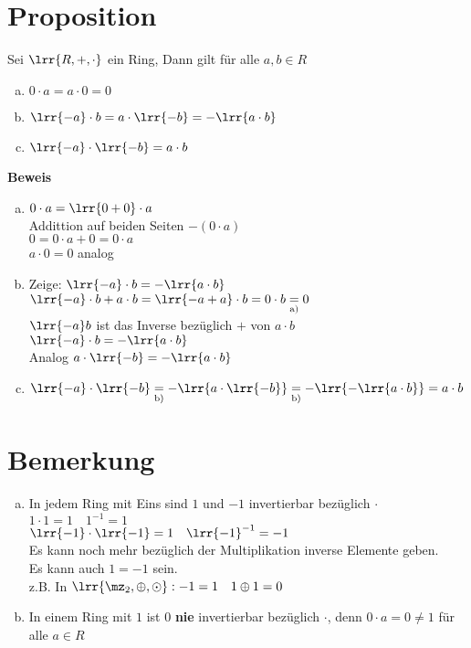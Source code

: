 \section{Proposition}
	Sei $\lrr{R,+,\cdot}$ ein Ring, Dann gilt für alle $a,b\in R$
	\begin{enumerate}[a)]
		\item $0\cdot a=a\cdot 0=0$
		\item $\lrr{-a}\cdot b=a\cdot\lrr{-b}=-\lrr{a\cdot b}$
		\item $\lrr{-a}\cdot\lrr{-b}=a\cdot b$
	\end{enumerate}
	\textbf{Beweis}
	\begin{enumerate}[a)]
		\item $0\cdot a =\lrr{0+0}\cdot a$ \\
			Addittion auf beiden Seiten $-(0\cdot a)$\\
			$0=0\cdot a+0=0\cdot a$\\
			$a\cdot 0=0$ analog
		\item Zeige: $\lrr{-a}\cdot b=-\lrr{a\cdot b}$\\
			$\lrr{-a}\cdot b+a\cdot b=\lrr{-a+a}\cdot b = 0\cdot b \underset{\mbox{\scriptsize a)}}{=} 0$\\
			$\lrr{-a}b$ ist das Inverse bezüglich $+$ von $a\cdot b$\\
			$\lrr{-a}\cdot b=-\lrr{a\cdot b}$\\
			Analog $a\cdot\lrr{-b}=-\lrr{a\cdot b}$
		\item $\lrr{-a}\cdot\lrr{-b}\underset{\mbox{\scriptsize b)}}{=}-\lrr{a\cdot\lrr{-b}}\underset{\mbox{\scriptsize b)}}{=}-\lrr{-\lrr{a\cdot b}}=a\cdot b$
	\end{enumerate}
\section{Bemerkung}
	\begin{enumerate}[a)]
		\item In jedem Ring mit Eins sind $1$ und $-1$ invertierbar bezüglich $\cdot$\\
			$1\cdot 1=1\quad 1^{-1}=1$\\
			$\lrr{-1}\cdot\lrr{-1}=1\quad\lrr{-1}^{-1}=-1$\\
			Es kann noch mehr bezüglich der Multiplikation inverse Elemente geben.\\
			Es kann auch $1=-1$ sein.\\
			z.B. In $\lrr{\mz_2,\oplus,\odot}: -1=1\quad 1\oplus 1=0$
		\item In einem Ring mit $1$ ist $0$ \textbf{nie} invertierbar bezüglich $\cdot$, denn $0\cdot a=0\neq 1$ für alle $a\in R$
	\end{enumerate}
